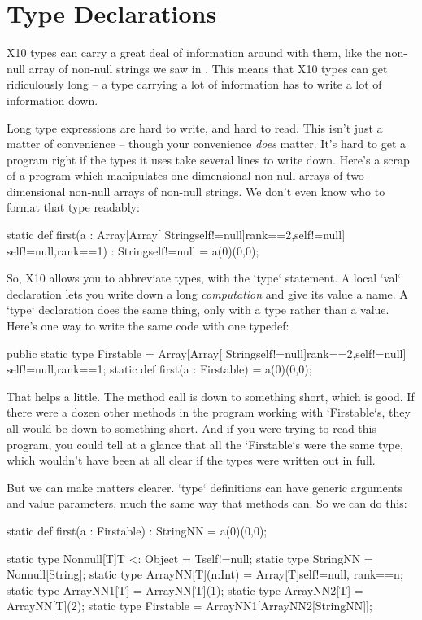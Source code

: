 \section{Type Declarations}
\label{sect:TypeDecl}

X10 types can carry a great deal of information around with them, like the
non-null array of non-null strings we saw in .
This means that X10 types can get ridiculously long -- a type carrying a lot
of information has to write a lot of information down.  

Long type expressions are hard to write, and hard to read.  This isn't just a
matter of convenience -- though your convenience {\em does} matter.  It's hard
to get a program right if the types it uses take several lines to write down.
Here's a scrap of a program which manipulates one-dimensional non-null arrays
of two-dimensional non-null arrays of non-null strings.  We don't even know
who to format that type readably: 
\begin{xtennum}[]
static def first(a : Array[Array[
       String{self!=null}]{rank==2,self!=null}]
       {self!=null,rank==1})
 : String{self!=null} = a(0)(0,0); 
\end{xtennum}

So, X10 allows you to abbreviate types, with the \xcd`type` statement.
A local \xcd`val` declaration lets you write down a long {\em computation} and
give its value a name.  A \xcd`type` declaration does the same thing, only
with a type rather than a value.  Here's one way to write the same code 
with one typedef: 
\begin{xtennum}[]
public static type Firstable = Array[Array[
   String{self!=null}]{rank==2,self!=null}]
   {self!=null,rank==1};
static def first(a : Firstable) = a(0)(0,0);
\end{xtennum}

That helps a little.  The method call is down to something short, which is
good.  If there were a dozen other methods in the program working with
\xcd`Firstable`s, they all would be down to something short.  And if you were
trying to read this program, you could tell at a glance that all the
\xcd`Firstable`s were the same type, which wouldn't have been at all clear if
the types were written out in full.

But we can make matters clearer. \xcd`type` definitions can have generic
arguments and value parameters, much the same way that methods can.  So we can
do this:
\begin{xtennum}[]
static def first(a : Firstable) : StringNN = a(0)(0,0);

static type Nonnull[T]{T <: Object} = T{self!=null};
static type StringNN = Nonnull[String];
static type ArrayNN[T](n:Int) = Array[T]{self!=null, rank==n};
static type ArrayNN1[T] = ArrayNN[T](1);
static type ArrayNN2[T] = ArrayNN[T](2);
static type Firstable = ArrayNN1[ArrayNN2[StringNN]];
\end{xtennum}

